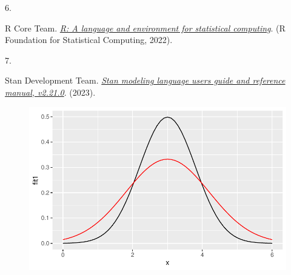 \documentclass[
]{agujournal2019}
\newlength{\cslhangindent}
\newlength{\csllabelwidth}
\newlength{\cslentryspacingunit} %
\newenvironment{CSLReferences}[2] %
 {%
  \setlength{\parindent}{0pt}
  \ifodd #1
  \let\oldpar\par
  \def\par{\hangindent=\cslhangindent\oldpar}
  \fi
  \setlength{\parskip}{#2\cslentryspacingunit}
 }%
 {}
\newcommand{\CSLLeftMargin}[1]{\parbox[t]{\csllabelwidth}{#1}}
\newcommand{\CSLRightInline}[1]{\parbox[t]{\linewidth - \csllabelwidth}{#1}\break}
\begin{document}
\begin{CSLReferences}{0}{0}
\leavevmode{}%
\CSLLeftMargin{6. }%
\CSLRightInline{R Core Team. \emph{\href{https://www.R-project.org/}{R:
A language and environment for statistical computing}}. (R Foundation
for Statistical Computing, 2022).}

\leavevmode{}%
\CSLLeftMargin{7. }%
\CSLRightInline{Stan Development Team.
\emph{\href{https://mc-stan.org}{Stan modeling language users guide and
reference manual, v2.21.0}}. (2023).}

\end{CSLReferences}

\begin{figure}[H]

{\centering \includegraphics{index_files/figure-pdf/unnamed-chunk-2-1.pdf}

}

\end{figure}
\end{document}
